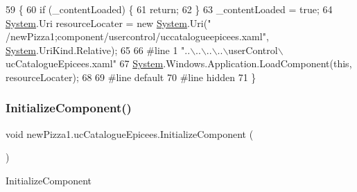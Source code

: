 \begin{DoxyCode}
59                                           \{
60             \textcolor{keywordflow}{if} (\_contentLoaded) \{
61                 \textcolor{keywordflow}{return};
62             \}
63             \_contentLoaded = \textcolor{keyword}{true};
64             \hyperlink{namespaceSystem}{System}.Uri resourceLocater = \textcolor{keyword}{new} \hyperlink{namespaceSystem}{System}.Uri(\textcolor{stringliteral}{"
      /newPizza1;component/usercontrol/uccatalogueepicees.xaml"}, \hyperlink{namespaceSystem}{System}.UriKind.Relative);
65             
66 \textcolor{preprocessor}{            #line 1 "..\(\backslash\)..\(\backslash\)..\(\backslash\)..\(\backslash\)userControl\(\backslash\)ucCatalogueEpicees.xaml"
}
67             \hyperlink{namespaceSystem}{System}.Windows.Application.LoadComponent(\textcolor{keyword}{this}, resourceLocater);
68             
69 \textcolor{preprocessor}{            #line default
}
70 \textcolor{preprocessor}{            #line hidden
}
71         \}
\end{DoxyCode}
\mbox{\label{classnewPizza1_1_1ucCatalogueEpicees_a88c609f29d5b46d57c31019576f8d7d8}} 
\subsubsection{\texorpdfstring{Initialize\+Component()}{InitializeComponent()}\hspace{0.1cm}{\footnotesize\ttfamily [6/6]}}
{\footnotesize\ttfamily void new\+Pizza1.\+uc\+Catalogue\+Epicees.\+Initialize\+Component (\begin{DoxyParamCaption}{ }\end{DoxyParamCaption})\hspace{0.3cm}{\ttfamily [inline]}}



Initialize\+Component 


